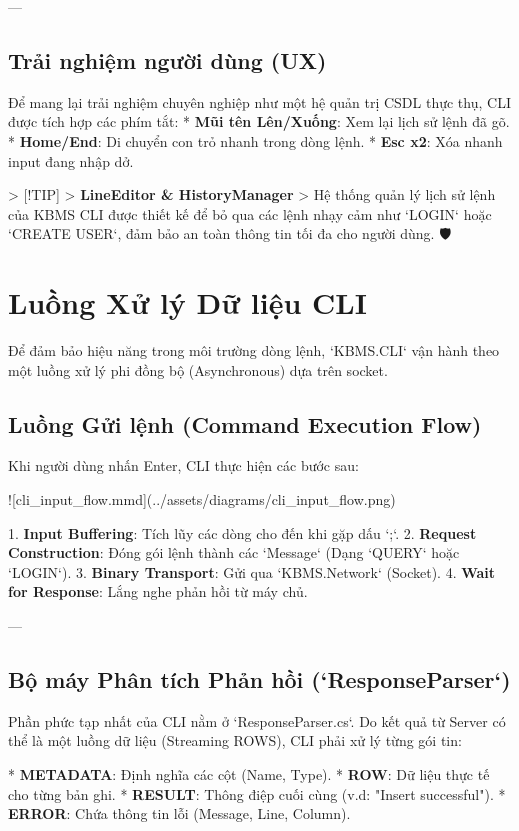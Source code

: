 ---

\subsection{Trải nghiệm người dùng (UX)}

Để mang lại trải nghiệm chuyên nghiệp như một hệ quản trị CSDL thực thụ, CLI được tích hợp các phím tắt:
*   \textbf{Mũi tên Lên/Xuống}: Xem lại lịch sử lệnh đã gõ.
*   \textbf{Home/End}: Di chuyển con trỏ nhanh trong dòng lệnh.
*   \textbf{Esc x2}: Xóa nhanh input đang nhập dở.

> [!TIP]
> \textbf{LineEditor \& HistoryManager}
> Hệ thống quản lý lịch sử lệnh của KBMS CLI được thiết kế để bỏ qua các lệnh nhạy cảm như `LOGIN` hoặc `CREATE USER`, đảm bảo an toàn thông tin tối đa cho người dùng. 🛡️

\section{Luồng Xử lý Dữ liệu CLI}

Để đảm bảo hiệu năng trong môi trường dòng lệnh, `KBMS.CLI` vận hành theo một luồng xử lý phi đồng bộ (Asynchronous) dựa trên socket.

\subsection{Luồng Gửi lệnh (Command Execution Flow)}

Khi người dùng nhấn Enter, CLI thực hiện các bước sau:

![cli\_input\_flow.mmd](../assets/diagrams/cli\_input\_flow.png)

1.  \textbf{Input Buffering}: Tích lũy các dòng cho đến khi gặp dấu `;`.
2.  \textbf{Request Construction}: Đóng gói lệnh thành các `Message` (Dạng `QUERY` hoặc `LOGIN`).
3.  \textbf{Binary Transport}: Gửi qua `KBMS.Network` (Socket).
4.  \textbf{Wait for Response}: Lắng nghe phản hồi từ máy chủ.

---

\subsection{Bộ máy Phân tích Phản hồi (`ResponseParser`)}

Phần phức tạp nhất của CLI nằm ở `ResponseParser.cs`. Do kết quả từ Server có thể là một luồng dữ liệu (Streaming ROWS), CLI phải xử lý từng gói tin:

*   \textbf{METADATA}: Định nghĩa các cột (Name, Type).
*   \textbf{ROW}: Dữ liệu thực tế cho từng bản ghi.
*   \textbf{RESULT}: Thông điệp cuối cùng (v.d: "Insert successful").
*   \textbf{ERROR}: Chứa thông tin lỗi (Message, Line, Column).

